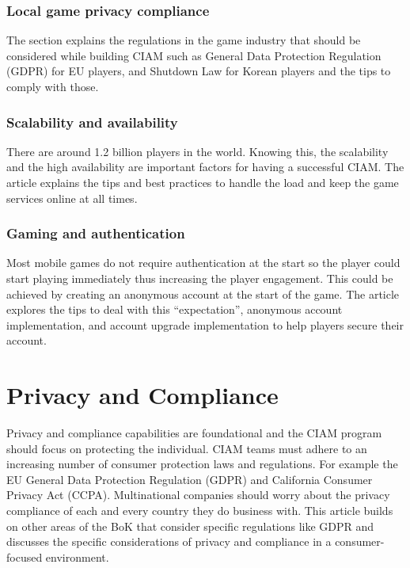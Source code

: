 \hypertarget{local-game-privacy-compliance}{%
\subsubsection{Local game privacy
compliance}\label{local-game-privacy-compliance}}

The section explains the regulations in the game industry that should be
considered while building CIAM such as General Data Protection
Regulation (GDPR) for EU players, and Shutdown Law for Korean players
and the tips to comply with those.

\hypertarget{scalability-and-availability}{%
\subsubsection{Scalability and availability
}\label{scalability-and-availability}}

There are around 1.2 billion players in the world. Knowing this, the
scalability and the high availability are important factors for having a
successful CIAM. The article explains the tips and best practices to
handle the load and keep the game services online at all times.~

\hypertarget{gaming-and-authentication}{%
\subsubsection{Gaming and authentication}\label{gaming-and-authentication}}

Most mobile games do not require authentication at the start so the
player could start playing immediately thus increasing the player
engagement. This could be achieved by creating an anonymous account at
the start of the game. The article explores the tips to deal with this
``expectation'', anonymous account implementation, and account upgrade
implementation to help players secure their account.

\hypertarget{privacy-and-compliance}{%
\section{Privacy and Compliance}\label{privacy-and-compliance}}

Privacy and compliance capabilities are foundational and the CIAM
program should focus on protecting the individual. CIAM teams must
adhere to an increasing number of consumer protection laws and
regulations. For example the EU General Data Protection Regulation
(GDPR) and California Consumer Privacy Act (CCPA). Multinational
companies should worry about the privacy compliance of each and every
country they do business with. This article builds on other areas of the
BoK that consider specific regulations like GDPR and discusses the
specific considerations of privacy and compliance in a consumer-focused
environment.

